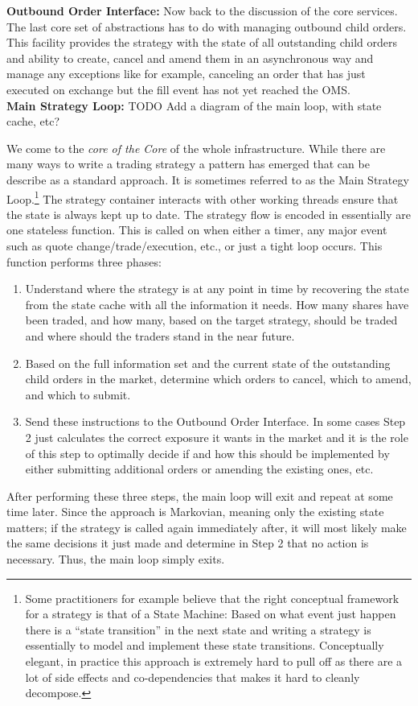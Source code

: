 \noindent\textbf{Outbound Order Interface:} Now back to the discussion of the core services. The last core set of abstractions has to do with managing outbound child orders. This facility provides the strategy with the state of all outstanding child orders and ability to create, cancel and amend them in an asynchronous way and manage any exceptions like for example, canceling an order that has just executed on exchange but the fill event has not yet reached the OMS. \\


\noindent\textbf{Main Strategy Loop:} TODO Add a diagram of the main loop, with state cache, etc?


We come to the \emph{core of the Core} of the whole infrastructure. While there are many ways to write a trading strategy a pattern has emerged that can be describe as a standard approach. It is sometimes referred to as the Main Strategy Loop.\footnote{Some practitioners for example believe that the right conceptual framework for a strategy is that of a State Machine: Based on what event just happen there is a ``state transition'' in the next state and writing a strategy is essentially to model and implement these state transitions. Conceptually elegant, in practice this approach is extremely hard to pull off as there are a lot of side effects and co-dependencies that makes it hard to cleanly decompose.} The strategy container interacts with other working threads ensure that the state is always kept up to date. The strategy flow is encoded in essentially are one stateless function. This is called on when either a timer, any major event such as quote change/trade/execution, etc., or just a tight loop occurs. This function performs three phases:
        \begin{enumerate}
        \item Understand where the strategy is at any point in time by recovering the state from the state cache with all the information it needs. How many shares have been traded, and how many, based on the target strategy, should be traded and where should the traders stand in the near future. 
        \item Based on the full information set and the current state of the outstanding child orders in the market, determine which orders to cancel, which to amend, and which to submit.
        \item Send these instructions to the Outbound Order Interface. In some cases Step 2 just calculates the correct exposure it wants in the market and it is the role of this step to optimally decide if and how this should be implemented by either submitting additional orders or amending the existing ones, etc.
        \end{enumerate}
After performing these three steps, the main loop will exit and repeat at some time later. Since the approach is Markovian, meaning only the existing state matters; if the strategy is called again immediately after, it will most likely make the same decisions it just made and determine in Step 2 that no action is necessary. Thus, the main loop simply exits. \\


